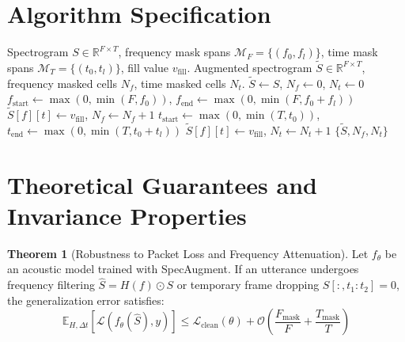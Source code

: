 \documentclass[11pt,a4paper]{article}
\theoremstyle{definition}
\newtheorem{theorem}{Theorem}[section]
\begin{document}
\section{Algorithm Specification}

\begin{algorithm}[H]
\caption{SpecAugment Time and Frequency Masking Pipeline}
\label{alg:spec_augment}
\begin{algorithmic}[1]
\Require Spectrogram $S \in \mathbb{R}^{F \times T}$, frequency mask spans $\mathcal{M}_F = \{(f_0, f_l)\}$, time mask spans $\mathcal{M}_T = \{(t_0, t_l)\}$, fill value $v_{\text{fill}}$.
\Ensure Augmented spectrogram $\tilde{S} \in \mathbb{R}^{F \times T}$, frequency masked cells $N_f$, time masked cells $N_t$.
\State $\tilde{S} \gets S$, $N_f \gets 0$, $N_t \gets 0$
    \State $f_{\text{start}} \gets \max(0, \min(F, f_0))$, $f_{\text{end}} \gets \max(0, \min(F, f_0 + f_l))$
            \State $\tilde{S}[f][t] \gets v_{\text{fill}}$, $N_f \gets N_f + 1$
        \EndFor
    \EndFor
\EndFor
{}
    \State $t_{\text{start}} \gets \max(0, \min(T, t_0))$, $t_{\text{end}} \gets \max(0, \min(T, t_0 + t_l))$
            \State $\tilde{S}[f][t] \gets v_{\text{fill}}$, $N_t \gets N_t + 1$
        \EndFor
    \EndFor
\EndFor
\State \Return $\{\tilde{S}, N_f, N_t\}$
\end{algorithmic}
\end{algorithm}

\section{Theoretical Guarantees and Invariance Properties}

\begin{theorem}[Robustness to Packet Loss and Frequency Attenuation]
Let $f_\theta$ be an acoustic model trained with SpecAugment. If an utterance undergoes frequency filtering $\hat{S} = H(f) \odot S$ or temporary frame dropping $S[:, t_1:t_2] = 0$, the generalization error satisfies:
\begin{equation}
\mathbb{E}_{H, \Delta t} [\mathcal{L}(f_\theta(\hat{S}), y)] \le \mathcal{L}_{\text{clean}}(\theta) + \mathcal{O}\left( \frac{F_{\text{mask}}}{F} + \frac{T_{\text{mask}}}{T} \right)
\end{equation}
\end{theorem}
\end{document}
